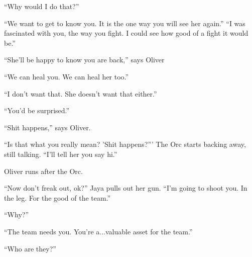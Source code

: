 ``Why would I do that?''

``We want to get to know you.  It is the one way you will see her again.'' ``I was fascinated with you, the way you fight.  I could see how good of a fight it would be.''

``She'll be happy to know you are back,'' says Oliver

``We can heal you.  We can heal her too.''

``I don't want that.  She doesn't want that either.''

``You'd be surprised.''

``Shit happens,'' says Oliver.

``Is that what you really mean?  'Shit happens?'''  The Orc starts backing away, still talking. ``I'll tell her you say hi.''

Oliver runs after the Orc.







``Now don't freak out, ok?'' Jaya pulls out her gun.  ``I'm going to shoot you.  In the leg.  For the good of the team.''

``Why?''

``The team needs you.  You're a...valuable asset for the team.''

``Who are they?''


